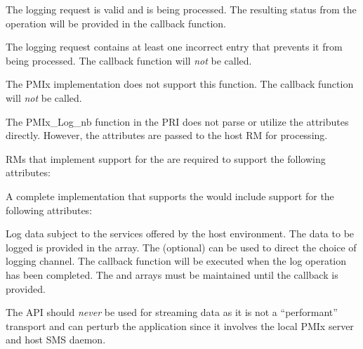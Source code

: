 \begin{arglist}
\end{arglist}

\begin{constantdesc}
\item {} The logging request is valid and is being processed. The resulting status from the operation will be provided in the callback function.
\item {} The logging request contains at least one incorrect entry that prevents it from being processed. The callback function will \emph{not} be called.
\item {} The \ac{PMIx} implementation does not support this function. The callback function will \emph{not} be called.
\end{constantdesc}

\priattr
The PMIx\_Log\_nb function in the \ac{PRI} does not parse or utilize the attributes directly. However, the attributes are passed to the host RM for processing.

\reqattr
\acp{RM} that implement support for the  are required to support the following attributes:


\optattr
A complete implementation that supports the  would include support for the following attributes:


\descr

Log data subject to the services offered by the host environment. The data to be logged is provided in the  array. The (optional)  can be used to direct the choice of logging channel.
The callback function will be executed when the log operation has been completed. The  and  arrays must be maintained until the callback is provided.

\adviceuserstart
The  API should \emph{never} be used for streaming data as it is not a ``performant'' transport and can perturb the application since it involves the local \ac{PMIx} server and host \ac{SMS} daemon.
\adviceuserend

